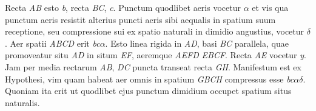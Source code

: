 Recta \textit{AB} esto \textit{b}, recta \textit{BC}, \textit{c}. Punctum quodlibet aeris vocetur $\alpha$ et vis qua punctum aeris resistit alterius puncti aeris sibi aequalis in spatium suum receptione, seu compressione\protect{} sui ex spatio naturali in dimidio angustius, vocetur $\delta$. Aer spatii \textit{ABCD} erit \textit{bc}$\alpha$. Esto linea rigida in \textit{AD}, basi \textit{BC} parallela, quae promoveatur situ \textit{AD} in situm \textit{EF}, aeremque \textit{AEFD}  \textit{EBCF}. Recta \textit{AE} vocetur \textit{y}. Jam per media rectarum \textit{AB}, \textit{DC} puncta transeat recta \textit{GH}. Manifestum est ex Hypothesi, vim quam habeat aer omnis  in spatium \textit{GBCH} compressus esse \textit{bc}$\alpha$$\delta$. Quoniam ita erit ut quodlibet ejus punctum dimidium occupet spatium situs naturalis.
\pend 